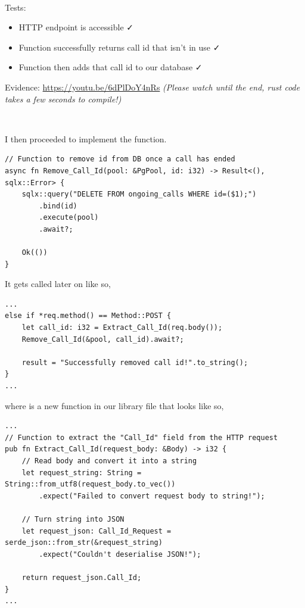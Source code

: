 {\color{gray} \hrulefill} \\ \vspace{0.2cm}

{\sffamily Tests:}

\begin{itemize}
\item HTTP endpoint is accessible \faCheck \\
\item Function successfully returns call id that isn't in use \faCheck \\
\item Function then adds that call id to our database \faCheck \\
\end{itemize}

{\sffamily Evidence:} \url{https://youtu.be/6dPlDoY4nRs}
\textit{(Please watch until the end, rust code takes a
few seconds to compile!)}

{\color{gray} \hrulefill} \\ \vspace{0.2cm}

I then proceeded to implement the 
function.

\begin{verbatim}
// Function to remove id from DB once a call has ended
async fn Remove_Call_Id(pool: &PgPool, id: i32) -> Result<(), sqlx::Error> {
    sqlx::query("DELETE FROM ongoing_calls WHERE id=($1);")
        .bind(id)
        .execute(pool)
        .await?;

    Ok(())
}
\end{verbatim}

It gets called later on like so,

\begin{verbatim}
...
else if *req.method() == Method::POST {
    let call_id: i32 = Extract_Call_Id(req.body());
    Remove_Call_Id(&pool, call_id).await?;

    result = "Successfully removed call id!".to_string();
}
...
\end{verbatim}

where  is a new function in our
library file that looks like so,

\begin{verbatim}
...
// Function to extract the "Call_Id" field from the HTTP request
pub fn Extract_Call_Id(request_body: &Body) -> i32 {
    // Read body and convert it into a string
    let request_string: String = String::from_utf8(request_body.to_vec())
        .expect("Failed to convert request body to string!");

    // Turn string into JSON
    let request_json: Call_Id_Request = serde_json::from_str(&request_string)
        .expect("Couldn't deserialise JSON!");

    return request_json.Call_Id;
}
...
\end{verbatim}

